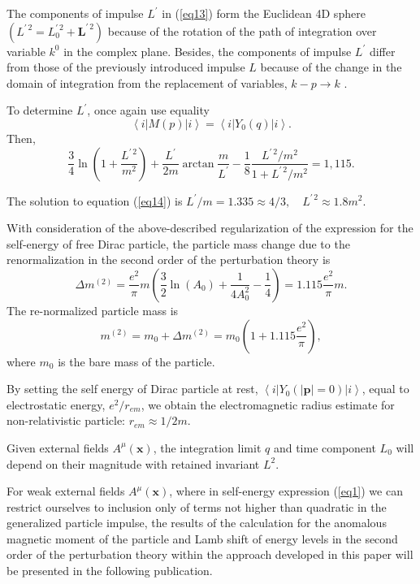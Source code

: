 \documentclass[a4paper,draft,showpacs,preprint,prd,aps]{revtex4}
\begin{document}
The components of impulse $L^\prime$ in (\ref{eq13}) form the Euclidean 4D
sphere $(L^{\prime\,2} = L_0^{\prime\,2} + \bm{L}^{\prime\,2})$
because of the rotation of the path of integration over variable $k^0$
in the complex plane. Besides, the components of impulse $L^\prime$ differ
from
those of the previously introduced impulse $L$ because of the change in the
domain of integration from the replacement of variables, $k - p \to k$
\cite{ref4}.

To determine $L^\prime$, once again use equality
\[
\left\langle i \right|M(p)\left| i \right\rangle =
\left\langle i \right|Y_0(q)\left| i \right\rangle .
\]
Then,
\begin{equation}
\label{eq14}
\frac 34\ln\left(1 + \frac{L^{\prime\,2}}{m^2}\right) +
\frac{L^\prime}{2m}\arctan\frac m{L^\prime} -
\frac 18\frac{L^{\prime\,2}/m^2}
{1 + L^{\prime\,2}/m^2} = 1,115.
\end{equation}

The solution to equation (\ref{eq14}) is $L^\prime/m = 1.335 \approx 4/3,
\quad L^{\prime\,2} \approx 1.8m^2$.

With consideration of the above-described regularization of the expression
for the self-energy of free Dirac particle, the particle mass change due to
the renormalization in the second order of the perturbation theory is
\begin{equation}
\label{eq15}
\Delta m^{(2)} = \frac{e^2}\pi m \left(
\frac 32\ln(A_0)+\frac 1{4A_0^2}-\frac 14\right)=
1.115\frac{e^2}\pi m.
\end{equation}
The re-normalized particle mass is
\begin{equation}
\label{eq16}
m^{(2)} = m_0 + \Delta m^{(2)} = m_0\left(1 + 1.115\frac{e^2}\pi\right),
\end{equation}
where $m_0$ is the bare mass of the particle.

By setting the self energy of Dirac particle at rest,
$\left\langle i \right|Y_0(|\bm{p}| = 0)\left| i \right\rangle$,
equal to electrostatic energy, $e^2/r_{em}$, we obtain the
electromagnetic radius estimate for non-relativistic particle:
$r_{em} \approx 1/2m$.

Given external fields $A^\mu(\bm{x})$, the integration limit
$q$ and time component $L_0$ will depend on their magnitude with
retained invariant $L^2$.

For weak external fields $A^\mu( \bm{x})$, where in self-energy
expression (\ref{eq1}) we can restrict ourselves to inclusion only
of terms not higher than quadratic in the generalized particle impulse,
the results of the calculation for the anomalous magnetic moment of the
particle and Lamb shift of energy levels in the second order of the
perturbation theory within the approach developed in this paper will be
presented in the following publication.
\end{document}
